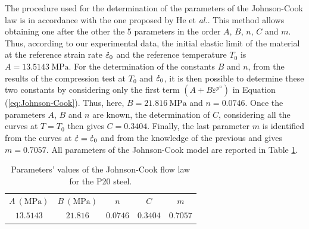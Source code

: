 \documentclass[twoside,english,1p,final,sort&compress]{elsarticle}
\makeatletter
\theoremstyle{plain}
\DeclareRobustCommand{\mdot}[1]{\accentset{\mbox{\bfseries .}}{#1}}
\DeclareRobustCommand{\eal}{et \emph{al.}\@\xspace}
\DeclareRobustCommand{\MPa}{\text{MPa}}
\makeatother
\begin{document}
The procedure used for the determination of the parameters of the Johnson-Cook law is in accordance with the one proposed by He \eal \cite{He-2013}.
This method allows obtaining one after the other the 5 parameters in the order $A$, $B$, $n$, $C$ and $m$.
Thus, according to our experimental data, the initial elastic limit of the material at the reference strain rate $\mdot\varepsilon_0$ and the reference temperature $T_0$ is $A=13.5143~\MPa$.
For the determination of the constants $B$ and $n$, from the results of the compression test at $T_0$ and $\mdot\varepsilon_0$, it is then possible to determine these two constants by considering only the first term $\left(A+B\varepsilon^{p^{n}}\right)$ in Equation (\ref{eq:Johnson-Cook}).
Thus, here, $B=21.816~\MPa$ and $n=0.0746$.
Once the parameters $A$, $B$ and $n$ are known, the determination of $C$, considering all the curves at $T=T_0$ then gives $C=0.3404$.
Finally, the last parameter $m$ is identified from the curves at $\mdot\varepsilon=\mdot\varepsilon_0$ and from the knowledge of the previous and gives $m=0.7057$.
All parameters of the Johnson-Cook model are reported in Table \ref{tab:JC}.

\begin{table}[h!]
\centering
\caption{Parameters' values of the Johnson-Cook flow law for the P20 steel.}
\begin{tabular}{ccccc}
	\hline
	$A~(\MPa)$ & $B~(\MPa)$ &   $n$    &   $C$    &   $m$    \\
	   $13.5143$     &     $21.816$     & $0.0746$ & $0.3404$ & $0.7057$ \\ \hline
\end{tabular}
\label{tab:JC}
\end{table}
\end{document}
